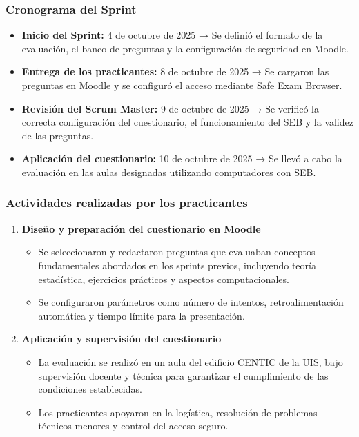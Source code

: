 \documentclass[letter,oneside,12pt,spanish]{report}
\begin{document}
\subsubsection*{Cronograma del Sprint}
\begin{itemize}
	\item \textbf{Inicio del Sprint:} 4 de octubre de 2025 → Se definió el formato de la evaluación, el banco de preguntas y la configuración de seguridad en Moodle.
	\item \textbf{Entrega de los practicantes:} 8 de octubre de 2025 → Se cargaron las preguntas en Moodle y se configuró el acceso mediante Safe Exam Browser.
	\item \textbf{Revisión del Scrum Master:} 9 de octubre de 2025 → Se verificó la correcta configuración del cuestionario, el funcionamiento del SEB y la validez de las preguntas.
	\item \textbf{Aplicación del cuestionario:} 10 de octubre de 2025 → Se llevó a cabo la evaluación en las aulas designadas utilizando computadores con SEB.
\end{itemize}

\subsubsection*{Actividades realizadas por los practicantes}

\begin{enumerate}
	\item \textbf{Diseño y preparación del cuestionario en Moodle}  
	\begin{itemize}
		\item Se seleccionaron y redactaron preguntas que evaluaban conceptos fundamentales abordados en los sprints previos, incluyendo teoría estadística, ejercicios prácticos y aspectos computacionales.
		\item Se configuraron parámetros como número de intentos, retroalimentación automática y tiempo límite para la presentación.
	\end{itemize}
	
	
	\item \textbf{Aplicación y supervisión del cuestionario}  
	\begin{itemize}
		\item La evaluación se realizó en un aula del edificio CENTIC de la UIS, bajo supervisión docente y técnica para garantizar el cumplimiento de las condiciones establecidas.
		\item Los practicantes apoyaron en la logística, resolución de problemas técnicos menores y control del acceso seguro.
	\end{itemize}
\end{enumerate}
\end{document}
